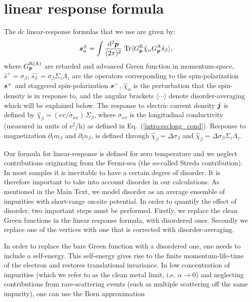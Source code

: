 \section{linear response formula}
The $dc$ linear-response formulas that we use are given by:
\begin{align}
    \boldsymbol{s}^\pm_\alpha = \int\frac{\mathrm{d}^2\boldsymbol{p}}{(2\pi)^2}\,\operatorname{Tr} \langle G_{\boldsymbol{p}}^\text{R} \hat{{\chi}}_\alpha G_{\boldsymbol{p}}^\text{A} \hat{s}_\beta\rangle ,
\end{align}
where $G_{\boldsymbol{p}}^\text{R(A)}$ are retarded and advanced Green function in momentum-space, $\hat{s}^+ = \sigma_\beta$, $\hat{s}_\beta^-=\sigma_\beta\Sigma_z \Lambda_z$ are the operators corresponding to the spin-polarization $\boldsymbol{s}^+$ and staggered spin-polarization $\boldsymbol{s}^-$, $\hat{\chi}_\alpha$ is the perturbation that the spin-density is in response to, and the angular brackets $\langle\cdots\rangle$ denote disorder-averaging which will be explained below. The response to electric current density $\boldsymbol{j}$ is defined by $\hat{\chi}_\beta = (e v /\sigma_{xx})\, \Sigma_\beta$, where $\sigma_{xx}$ is the longitudinal conductivity (measured in units of e$^2$/h) as defined in Eq.~(\ref{intro:eq:long_cond}). Response to magnetization $\partial_t m_\beta$ and $\partial_t n_\beta$, is defined through $\hat{\chi}_\beta = \Delta \sigma_\beta$ and $\hat{\chi}_\beta = \Delta \sigma_\beta \Sigma_z\Lambda_z$. 

Our formula for linear-response is defined for zero temperature and we neglect contributions originating from the Fermi-sea (the so-called Streda contribution).  In most samples it is inevitable to have a certain degree of disorder. It is therefore important to take into account disorder in our calculations. As mentioned in the Main Text, we model disorder as an average ensemble of impurities with short-range on-site potential. In order to quantify the effect of disorder, two important steps must be performed. Firstly, we replace the clean Green functions in the linear response formula, with disordered ones. Secondly we replace one of the vertices with one that is corrected with disorder-averaging.

In order to replace the bare Green function with a disordered one, one needs to include a self-energy. This self-energy gives rise to the finite momentum-life-time of the electron and restores translational invariance.  In low concentration of impurities (which we refer to as the clean metal limit, i.e. $\alpha\rightarrow0$) and neglecting contributions from rare-scattering events (such as multiple scattering off the same impurity), one can use the Born approximation

